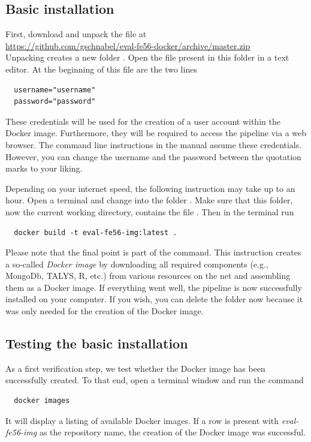 \documentclass[12pt,a4paper]{scrartcl}
\begin{document}
 \subsection{Basic installation}
 \label{subsec:install_basic}
  
 First, download and unpack the file at
 \\[2ex]
 \indent\url{https://github.com/gschnabel/eval-fe56-docker/archive/master.zip}
 \\[2ex]
 \noindent 
 Unpacking creates a new folder .
 Open the file  present in this folder in a text editor. At the beginning of this file are the two lines
\begin{verbatim}
  username="username"
  password="password"
\end{verbatim}
 These credentials will be used for the creation of a user account within the Docker image.
 Furthermore, they will be required to access the pipeline via a web browser.
 The command line instructions in the manual assume these credentials. 
However, you can change the username and the password between the quotation marks to your liking.
 
 Depending on your internet speed, the following instruction may take up to an hour.
 Open a terminal and change into the folder .
 Make sure that this folder, now the current working directory, contains the file .
Then in the terminal run
\begin{verbatim}
  docker build -t eval-fe56-img:latest . 
\end{verbatim}
 Please note that the final point is part of the command.
 This instruction creates a so-called \textit{Docker image} by downloading all required components (e.g., MongoDb, TALYS, R, etc.) from various resources on the net and assembling them as a Docker image.
 If everything went well, the pipeline is now successfully installed on your computer.
 If you wish, you can delete the folder  now because it was only needed for the creation of the Docker image.

 \subsection{Testing the basic installation}
 \label{subsec:test_basic_install}
 As a first verification step, we test whether the Docker image has been successfully created.
 To that end, open a terminal window and run the command
\begin{verbatim}
  docker images
\end{verbatim}
 It will display a listing of available Docker images.
 If a row is present with \textit{eval-fe56-img} as the repository name, the creation of the Docker image was successful.
 
\end{document}
